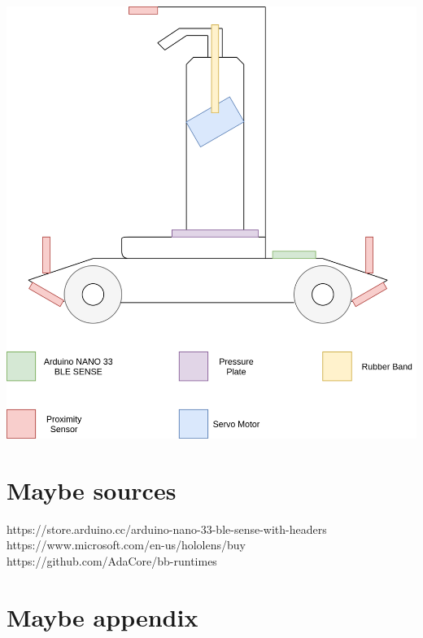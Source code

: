 \documentclass{article}
\begin{document}
\includegraphics[width=\linewidth]{img/prototype-drawing.png}

\section{Maybe sources}

https://store.arduino.cc/arduino-nano-33-ble-sense-with-headers\\
https://www.microsoft.com/en-us/hololens/buy\\
https://github.com/AdaCore/bb-runtimes

\section{Maybe appendix}
\end{document}
